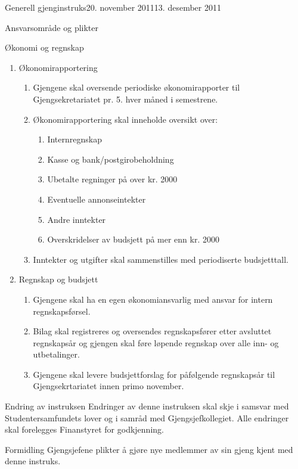 \begin{instruks}{Generell gjenginstruks}{20. november 2011}{13. desember 2011}
\begin{instruksledd}{Ansvarsområde og plikter}
    \end{instruksledd}

	\begin{instruksledd}{Økonomi og regnskap}
		\begin{enumerate}
			\item Økonomirapportering
			\begin{enumerate}  
				\item Gjengene skal oversende periodiske økonomirapporter til
				Gjengsekretariatet pr. 5. hver måned i semestrene.
				\item Økonomirapportering skal inneholde oversikt over:
				\begin {enumerate} 
					\item Internregnskap
					\item Kasse og bank/postgirobeholdning
					\item Ubetalte regninger på over kr. 2000
					\item Eventuelle annonseintekter
					\item Andre inntekter
					\item Overskridelser av budsjett på mer enn kr. 2000
				\end {enumerate}
				\item Inntekter og utgifter skal sammenstilles med periodiserte 
				budsjetttall.
			\end {enumerate}
			\item {Regnskap og budsjett}
			\begin {enumerate}
				\item Gjengene skal ha en egen økonomiansvarlig med ansvar for intern 
				regnskapsførsel.
				\item Bilag skal registreres og oversendes regnskapsfører etter avsluttet 
				regnskapsår og gjengen skal føre løpende regnskap over alle inn- og 
				utbetalinger.
				\item Gjengene skal levere budsjettforslag for påfølgende regnskapsår til 
				Gjengsekrtariatet innen primo november.
			\end {enumerate}
		\end{enumerate}

	\end{instruksledd}

	\begin{instruksledd}{Endring av instruksen}
		Endringer av denne instruksen skal skje i samsvar med Studentersamfundets lover og i samråd 
		med Gjengsjefkollegiet. Alle endringer skal forelegges Finanstyret for godkjenning.

	\end{instruksledd}

	\begin{instruksledd}{Formidling}
		Gjengsjefene plikter å gjøre nye medlemmer av sin gjeng kjent med denne instruks.

	\end{instruksledd}
 	
\end{instruks}


